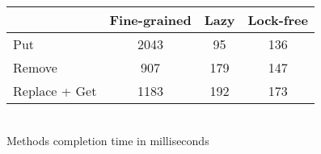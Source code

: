 \documentclass[a4paper]{article}
\begin{document}
\begin{table}[!h]
	\begin{center}
		\begin{tabular}[c]{|l|c|c|c|}
			\hline
			& Fine-grained & Lazy & Lock-free \\
			\hline 
			Put & 2043 & 95 & 136 \\
			\hline
			Remove & 907 & 179 & 147 \\
			\hline
			Replace + Get & 1183 & 192 & 173 \\
			\hline
		\end{tabular}
	\\[0.5cm]
	Methods completion time in milliseconds
	\end{center}
\end{table}
\end{document}
